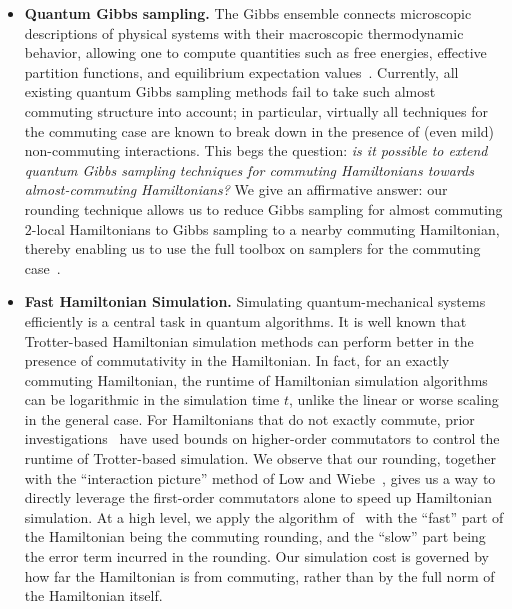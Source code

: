 \documentclass[11pt]{article}
\theoremstyle{plain}
\begin{document}
\begin{itemize}
    \item \textbf{Quantum Gibbs sampling.} The Gibbs ensemble connects microscopic descriptions of physical systems with their macroscopic thermodynamic behavior, allowing one to compute quantities such as free energies, effective partition functions, and equilibrium expectation values~\cite{PathriaBeale2011,Chandler1987,Callen1985,LandauLifshitz1980,Sachdev2011,AltlandSimons2010,Mermin1965,Tuckerman2010,LandauBinder2014}. Currently, all existing quantum Gibbs sampling methods fail to take such almost commuting structure into account; in particular, virtually all techniques for the commuting case are known to break down in the presence of (even mild) non-commuting interactions. This begs the question: \emph{is it possible to extend quantum Gibbs sampling techniques for commuting Hamiltonians towards almost-commuting Hamiltonians?}
We give an affirmative answer: our rounding technique allows us to reduce Gibbs sampling for almost 
commuting $2$-local Hamiltonians to Gibbs sampling to a nearby 
commuting Hamiltonian, thereby enabling us to use 
the full toolbox on samplers for the commuting case~\cite{hwang2025gibbsstatepreparationcommuting,schmidhuber2025hamiltoniandecodedquantuminterferometry}.

    \item \textbf{Fast Hamiltonian Simulation.} Simulating quantum-mechanical systems efficiently is a central task in quantum algorithms.
It is well known that Trotter-based Hamiltonian simulation methods can perform better in the presence of commutativity in the Hamiltonian. In fact, for an exactly commuting Hamiltonian, the runtime of Hamiltonian simulation algorithms can be logarithmic in the simulation time $t$, unlike the linear or worse scaling in the general case.
For Hamiltonians that do not exactly commute, prior investigations~\cite{childs2021theory} have used bounds on higher-order commutators to control the runtime of Trotter-based simulation. We observe that our rounding, together with the ``interaction picture'' method of Low and Wiebe~\cite{low2018hamiltonian}, gives us a way to directly leverage the first-order commutators alone to speed up Hamiltonian simulation. At a high level, we apply the algorithm of~\cite{low2018hamiltonian} with the ``fast'' part of the Hamiltonian being the commuting rounding, and the ``slow'' part being the error term incurred in the rounding. 
Our simulation cost is governed by how far the Hamiltonian is from commuting, rather than by the full norm of the Hamiltonian itself.
\end{itemize}




\printbibliography

\appendix
\end{document}
